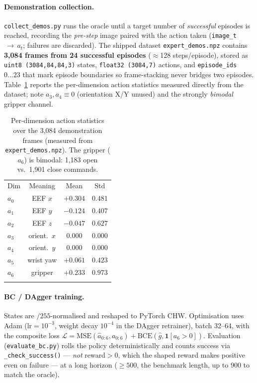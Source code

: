 \documentclass[10pt]{article}
\providecommand{\toprule}{\hline\noalign{\smallskip}}
\providecommand{\midrule}{\noalign{\smallskip}\hline\noalign{\smallskip}}
\providecommand{\bottomrule}{\noalign{\smallskip}\hline}
\newcommand{\code}[1]{\texttt{\small #1}}
\begin{document}
\paragraph{Demonstration collection.} \code{collect\_demos.py} runs the oracle until
a target number of \emph{successful} episodes is reached, recording the
\emph{pre-step} image paired with the action taken (\code{image\_t}$\,\to\,a_t$;
failures are discarded). The shipped dataset \code{expert\_demos.npz} contains
\textbf{3{,}084 frames from 24 successful episodes} ($\approx$128 steps/episode),
stored as \code{uint8 (3084,84,84,3)} states, \code{float32 (3084,7)} actions, and
\code{episode\_ids} $0\ldots23$ that mark episode boundaries so frame-stacking
never bridges two episodes. Table~\ref{tab:actions} reports the per-dimension
action statistics measured directly from the dataset; note $a_3,a_4\equiv0$
(orientation X/Y unused) and the strongly \emph{bimodal} gripper channel.

\begin{table}[t]
\centering
\caption{Per-dimension action statistics over the 3{,}084 demonstration frames
(measured from \code{expert\_demos.npz}). The gripper ($a_6$) is bimodal: 1{,}183
open vs.\ 1{,}901 close commands.}
\label{tab:actions}
\small
\begin{tabular}{l c c c}
\toprule
Dim & Meaning & Mean & Std \\
\midrule
$a_0$ & EEF $x$        & $+0.304$ & $0.481$ \\
$a_1$ & EEF $y$        & $-0.124$ & $0.407$ \\
$a_2$ & EEF $z$        & $-0.047$ & $0.627$ \\
$a_3$ & orient.\ $x$   & $0.000$  & $0.000$ \\
$a_4$ & orient.\ $y$   & $0.000$  & $0.000$ \\
$a_5$ & wrist yaw      & $+0.061$ & $0.423$ \\
$a_6$ & gripper        & $+0.233$ & $0.973$ \\
\bottomrule
\end{tabular}
\end{table}

\paragraph{BC / DAgger training.} States are $/255$-normalised and reshaped to
PyTorch CHW. Optimisation uses Adam ($\text{lr}=10^{-3}$, weight decay $10^{-4}$ in
the DAgger retrainer), batch 32--64, with the composite loss
$\mathcal{L}=\text{MSE}(\hat a_{0:6},a_{0:6})+\text{BCE}(\hat g,\mathbf{1}[a_6>0])$.
Evaluation (\code{evaluate\_bc.py}) rolls the policy deterministically and counts
success via \code{\_check\_success()} --- \emph{not} reward${>}0$, which the shaped
reward makes positive even on failure --- at a long horizon ($\geq500$, the
benchmark length, up to 900 to match the oracle).
\end{document}
